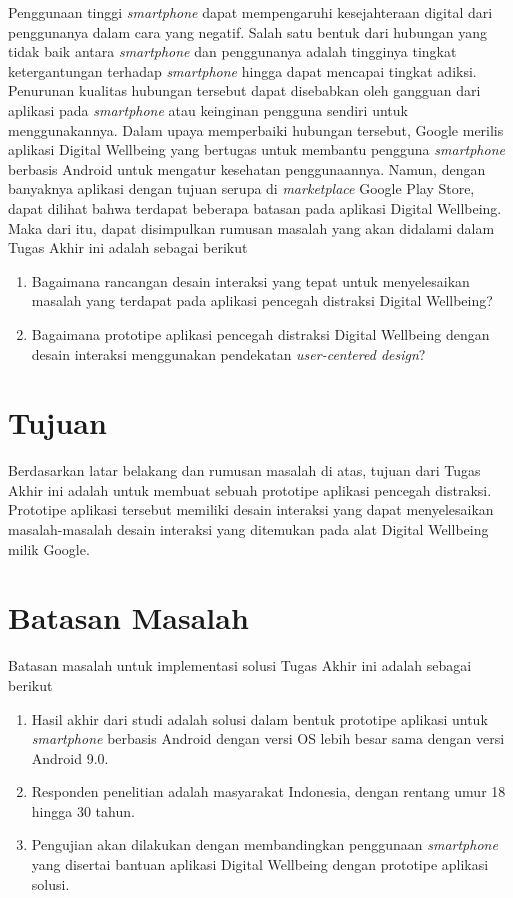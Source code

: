 Penggunaan tinggi \textit{smartphone} dapat mempengaruhi kesejahteraan digital dari penggunanya dalam cara yang negatif. Salah satu bentuk dari hubungan yang tidak baik antara \textit{smartphone} dan penggunanya adalah tingginya tingkat ketergantungan terhadap \textit{smartphone} hingga dapat mencapai tingkat adiksi. Penurunan kualitas hubungan tersebut dapat disebabkan oleh gangguan dari aplikasi pada \textit{smartphone} atau keinginan pengguna sendiri untuk menggunakannya. Dalam upaya memperbaiki hubungan tersebut, Google merilis aplikasi Digital Wellbeing yang bertugas untuk membantu pengguna \textit{smartphone} berbasis Android untuk mengatur kesehatan penggunaannya. Namun, dengan banyaknya aplikasi dengan tujuan serupa di \textit{marketplace} Google Play Store, dapat dilihat bahwa terdapat beberapa batasan pada aplikasi Digital Wellbeing. Maka dari itu, dapat disimpulkan rumusan masalah yang akan didalami dalam Tugas Akhir ini adalah sebagai berikut

\begin{enumerate}
  \item Bagaimana rancangan desain interaksi yang tepat untuk menyelesaikan masalah yang terdapat pada aplikasi pencegah distraksi Digital Wellbeing?
  \item Bagaimana prototipe aplikasi pencegah distraksi Digital Wellbeing dengan desain interaksi menggunakan pendekatan \emph{user-centered design}?
\end{enumerate}

\section{Tujuan}

Berdasarkan latar belakang dan rumusan masalah di atas, tujuan dari Tugas Akhir ini adalah untuk membuat sebuah prototipe aplikasi pencegah distraksi. Prototipe aplikasi tersebut memiliki desain interaksi yang dapat menyelesaikan masalah-masalah desain interaksi yang ditemukan pada alat Digital Wellbeing milik Google.


\section{Batasan Masalah}

Batasan masalah untuk implementasi solusi Tugas Akhir ini adalah sebagai berikut
\begin{enumerate}
  \item Hasil akhir dari studi adalah solusi dalam bentuk prototipe aplikasi untuk \textit{smartphone} berbasis Android dengan versi OS lebih besar sama dengan versi Android 9.0.
  \item Responden penelitian adalah masyarakat Indonesia, dengan rentang umur 18 hingga 30 tahun.
  \item Pengujian akan dilakukan dengan membandingkan penggunaan \textit{smartphone} yang disertai bantuan aplikasi Digital Wellbeing dengan prototipe aplikasi solusi.
\end{enumerate}

